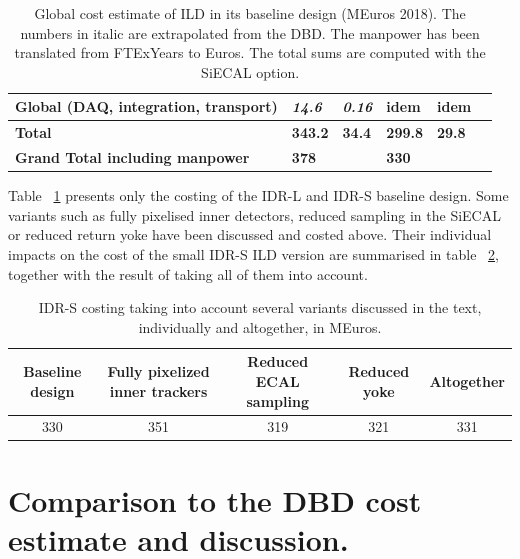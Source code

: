 \begin{table}[h!]
\begin{tabular}{ l p{0.15\hsize}p{0.15\hsize}p{0.15\hsize} p{0.15\hsize}p{0.15\hsize}}
\bf{Global (DAQ, integration, transport)}  &\bf{\it14.6} &\bf{\it0.16}& \bf{idem}& \bf{idem}\\
\midrule
\bf{Total} & \bf{343.2}   &  \bf{34.4}  & \bf{299.8} & \bf{29.8}  \\
\midrule
\bf{Grand Total including manpower}    & \bf{378}   &    & \bf{330} &   \\
 \bottomrule
\end{tabular}
\caption{\label{cost_summary}Global cost estimate of ILD in its baseline design (MEuros 2018). The numbers in italic are extrapolated from the DBD. The manpower has been translated from FTExYears to Euros. The total sums are computed with the SiECAL option.
}
\end{table}
Table ~\ref{cost_summary} presents only the costing of the IDR-L and IDR-S baseline design. Some variants such as fully pixelised inner detectors, reduced sampling in the SiECAL or reduced return yoke have been discussed and costed above. Their individual impacts on the cost of the small IDR-S ILD version are summarised in table ~\ref{cost_variants}, together with the result of taking all of them into account.
\begin{table}[h!]\hspace*{-0cm}\small
\begin{tabular}{ccccc}
\toprule
\bf {Baseline design} & \bf Fully pixelized inner trackers &  \bf Reduced ECAL sampling&\bf Reduced yoke&\bf Altogether\\
\midrule
330&351&319&321&331\\
\bottomrule
\end{tabular}
\caption{\label{cost_variants}IDR-S costing taking into account several variants discussed in the text, individually and altogether, in MEuros.}
\end{table}

\section{Comparison to the DBD cost estimate and discussion.}
 
